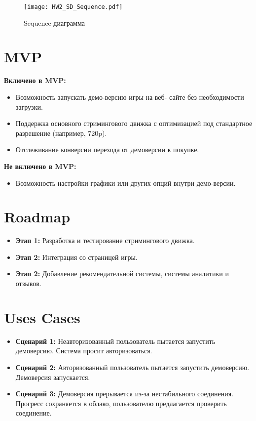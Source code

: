 \documentclass[12pt, a4paper]{article}
\begin{document}
\begin{figure}[htbp]
    \centering
    \texttt{[image: HW2\_SD\_Sequence.pdf]} 
    \caption{Sequence-диаграмма}
    \label{fig:Sequence}
\end{figure}
\newpage


\section{MVP}
\textbf{Включено в MVP:}
\begin{itemize}
	\item Возможность запускать демо-версию игры на веб-
	сайте без необходимости загрузки.
	\item Поддержка основного стримингового движка с 
	оптимизацией под стандартное разрешение (например, 
	720p).
	\item Отслеживание конверсии перехода от демоверсии к 
	покупке.
\end{itemize}
\par
\textbf{Не включено в MVP:}
\begin{itemize}
	\item Возможность настройки графики или других опций 
	внутри демо-версии.
\end{itemize}

\section{Roadmap}
\begin{itemize}
	\item \textbf{Этап 1: } Разработка и тестирование
	стримингового движка.
	\item \textbf{Этап 2: } Интеграция со страницей игры.
	\item \textbf{Этап 2: } Добавление рекомендательной 
	системы, системы аналитики и отзывов.
\end{itemize}

\section{Uses Cases}
\begin{itemize}
	\item \textbf{Сценарий 1: } Неавторизованный 
	пользователь пытается запустить демоверсию. Система
	просит авторизоваться.
	\item \textbf{Сценарий 2: } Авторизованный 
	пользователь пытается запустить демоверсию.
	Демоверсия запускается.
	\item \textbf{Сценарий 3: } Демоверсия прерывается 
	из-за нестабильного соединения. Прогресс сохраняется
	в облако, пользователю предлагается проверить 
	соединение.
\end{itemize}
\end{document}
